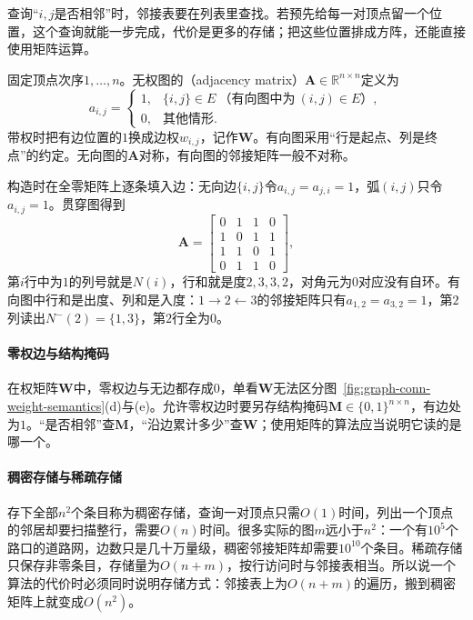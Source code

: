 查询“$i,j$是否相邻”时，邻接表要在列表里查找。若预先给每一对顶点留一个位置，这个查询就能一步完成，代价是更多的存储；把这些位置排成方阵，还能直接使用矩阵运算。

固定顶点次序$1,\ldots,n$。无权图的（adjacency matrix）$\bm A\in\mathbb R^{n\times n}$定义为
\[
a_{i,j}=
\begin{cases}
1, & \{i,j\}\in E\ \text{（有向图中为}\ (i,j)\in E\text{）},\\
0, & \text{其他情形}.
\end{cases}
\]
带权时把有边位置的$1$换成边权$w_{i,j}$，记作$\bm W$。有向图采用“行是起点、列是终点”的约定。无向图的$\bm A$对称，有向图的邻接矩阵一般不对称。

构造时在全零矩阵上逐条填入边：无向边$\{i,j\}$令$a_{i,j}=a_{j,i}=1$，弧$(i,j)$只令$a_{i,j}=1$。贯穿图得到
\begin{equation}
\bm A=
\begin{bmatrix}
0&1&1&0\\
1&0&1&1\\
1&1&0&1\\
0&1&1&0
\end{bmatrix},
\label{eq:graph-conn-running-adjacency}
\end{equation}
第$i$行中为$1$的列号就是$N(i)$，行和就是度$2,3,3,2$，对角元为$0$对应没有自环。有向图中行和是出度、列和是入度：$1\to2\leftarrow3$的邻接矩阵只有$a_{1,2}=a_{3,2}=1$，第$2$列读出$N^-(2)=\{1,3\}$，第$2$行全为$0$。

\paragraph{零权边与结构掩码}
在权矩阵$\bm W$中，零权边与无边都存成$0$，单看$\bm W$无法区分图~\ref{fig:graph-conn-weight-semantics}(d)与(e)。允许零权边时要另存结构掩码$\bm M\in\{0,1\}^{n\times n}$，有边处为$1$。“是否相邻”查$\bm M$，“沿边累计多少”查$\bm W$；使用矩阵的算法应当说明它读的是哪一个。

\paragraph{稠密存储与稀疏存储}
存下全部$n^2$个条目称为稠密存储，查询一对顶点只需$O(1)$时间，列出一个顶点的邻居却要扫描整行，需要$O(n)$时间。很多实际的图$m$远小于$n^2$：一个有$10^5$个路口的道路网，边数只是几十万量级，稠密邻接矩阵却需要$10^{10}$个条目。稀疏存储只保存非零条目，存储量为$O(n+m)$，按行访问时与邻接表相当。所以说一个算法的代价时必须同时说明存储方式：邻接表上为$O(n+m)$的遍历，搬到稠密矩阵上就变成$O(n^2)$。


